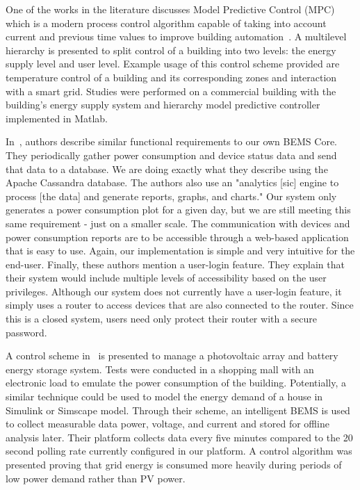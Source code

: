 One of the works in the literature discusses Model Predictive Control (MPC)
which is a modern process control algorithm capable of taking into account
current and previous time values to improve building
automation~\cite{Mayer2017}. A multilevel hierarchy is presented to split
control of a building into two levels: the energy supply level and user level.
Example usage of this control scheme provided are temperature control of a
building and its corresponding zones and interaction with a smart grid. Studies
were performed on a commercial building with the building's energy supply system
and hierarchy model predictive controller implemented in Matlab.

In~\cite{8246800}, authors describe similar functional requirements to our
own BEMS Core. They periodically gather power consumption and device status data
and send that data to a database. We are doing exactly what they describe using
the Apache Cassandra database. The authors also use an "analytics [sic] engine
to process [the data] and generate reports, graphs, and charts." Our system only
generates a power consumption plot for a given day, but we are still meeting
this same requirement - just on a smaller scale. The communication with devices
and power consumption reports are to be accessible through a web-based
application that is easy to use. Again, our implementation is simple and very
intuitive for the end-user. Finally, these authors mention a user-login feature.
They explain that their system would include multiple levels of accessibility
based on the user privileges. Although our system does not currently have a
user-login feature, it simply uses a router to access devices that are also
connected to the router. Since this is a closed system, users need only protect
their router with a secure password.

A control scheme in~\cite{Barchi2018} is presented to manage a photovoltaic
array and battery energy storage system. Tests were conducted in a shopping mall
with an electronic load to emulate the power consumption of the building.
Potentially, a similar technique could be used to model the energy demand of a
house in Simulink or Simscape model. Through their scheme, an intelligent BEMS
is used to collect measurable data  power, voltage, and current and stored for offline analysis later. Their platform collects data every five minutes compared to the 20 second polling rate currently configured in our platform. A control algorithm was presented proving that grid energy is consumed more heavily during periods of low power demand rather than PV power.

